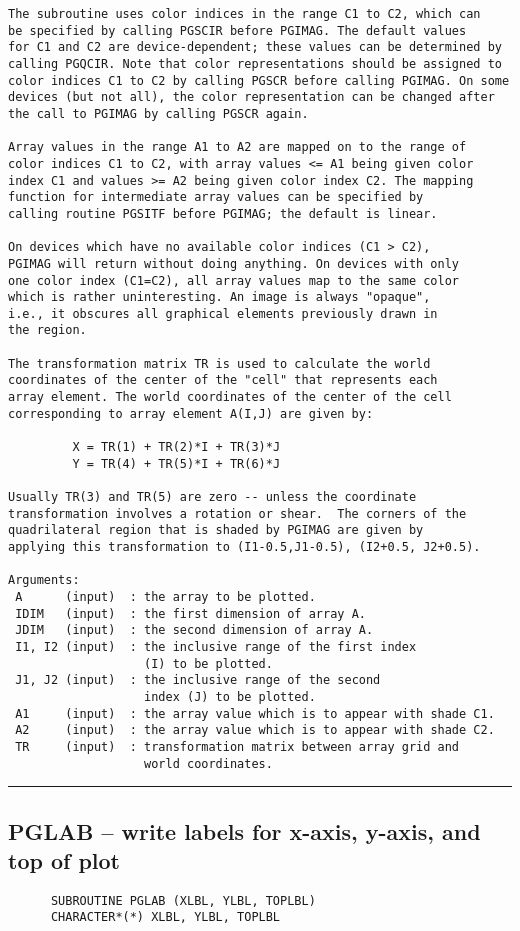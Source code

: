 {\begin{verbatim}
The subroutine uses color indices in the range C1 to C2, which can
be specified by calling PGSCIR before PGIMAG. The default values
for C1 and C2 are device-dependent; these values can be determined by
calling PGQCIR. Note that color representations should be assigned to
color indices C1 to C2 by calling PGSCR before calling PGIMAG. On some
devices (but not all), the color representation can be changed after
the call to PGIMAG by calling PGSCR again.

Array values in the range A1 to A2 are mapped on to the range of
color indices C1 to C2, with array values <= A1 being given color
index C1 and values >= A2 being given color index C2. The mapping
function for intermediate array values can be specified by
calling routine PGSITF before PGIMAG; the default is linear.

On devices which have no available color indices (C1 > C2),
PGIMAG will return without doing anything. On devices with only
one color index (C1=C2), all array values map to the same color
which is rather uninteresting. An image is always "opaque",
i.e., it obscures all graphical elements previously drawn in
the region.

The transformation matrix TR is used to calculate the world
coordinates of the center of the "cell" that represents each
array element. The world coordinates of the center of the cell
corresponding to array element A(I,J) are given by:

         X = TR(1) + TR(2)*I + TR(3)*J
         Y = TR(4) + TR(5)*I + TR(6)*J

Usually TR(3) and TR(5) are zero -- unless the coordinate
transformation involves a rotation or shear.  The corners of the
quadrilateral region that is shaded by PGIMAG are given by
applying this transformation to (I1-0.5,J1-0.5), (I2+0.5, J2+0.5).

Arguments:
 A      (input)  : the array to be plotted.
 IDIM   (input)  : the first dimension of array A.
 JDIM   (input)  : the second dimension of array A.
 I1, I2 (input)  : the inclusive range of the first index
                   (I) to be plotted.
 J1, J2 (input)  : the inclusive range of the second
                   index (J) to be plotted.
 A1     (input)  : the array value which is to appear with shade C1.
 A2     (input)  : the array value which is to appear with shade C2.
 TR     (input)  : transformation matrix between array grid and
                   world coordinates.
\end{verbatim}
\hrule


\subsection*{PGLAB -- write labels for x-axis, y-axis, and top of plot }
\begin{verbatim}
      SUBROUTINE PGLAB (XLBL, YLBL, TOPLBL)
      CHARACTER*(*) XLBL, YLBL, TOPLBL


\end{verbatim}}
